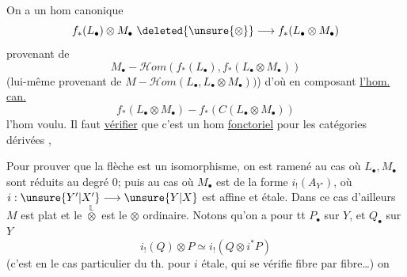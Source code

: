 On a un hom canonique
\[
f_*(L_\bullet)\otimes M_\bullet\ \deleted{\unsure{\otimes}}\longrightarrow f_*(L_\bullet\otimes M_\bullet)
\]
provenant de
\[
M_\bullet-\mathcal Hom(f_*(L_\bullet),f_*(L_\bullet\otimes M_\bullet))
\]
(lui-même provenant de $M-\mathcal Hom(L_\bullet,L_\bullet\otimes M_\bullet))$)
d'où en composant  \uline{l'hom. can.}
\[
f_*(L_\bullet\otimes M_\bullet)-f_*(C(L_\bullet\otimes M_\bullet))
\]
l'hom voulu. Il faut \uline{vérifier} que
c'est un hom \uline{fonctoriel} pour les catégories
dérivées , 

Pour prouver que la flèche est un isomorphisme,
on est ramené au cas où $L_\bullet,M_\bullet$ sont
réduits au degré $0$;  puis au cas où $M_\bullet$ est
de la forme $i_!(A_{Y'})$, où $i:\unsure{Y'|X'}\longrightarrow\unsure{Y|X}$ est
affine et étale. Dans ce cas d'ailleurs $M$ est
plat et le $\overset{\mathbb L}{\otimes}$ est le $\otimes$ ordinaire. Notons
qu'on a pour tt $P_\bullet$ sur $Y$, et  $Q_\bullet$ sur $Y$
\[
i_!(Q)\otimes P\simeq i_!(Q\otimes i^*P)
\]
(c'est en le cas particulier du th. pour
$i$ étale, qui se vérifie fibre par fibre\ldots) on

